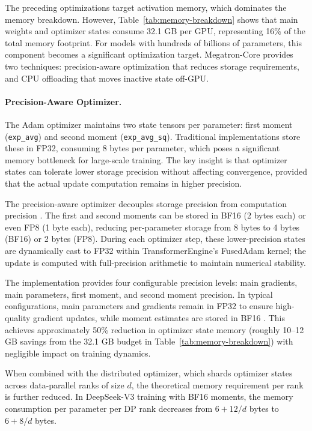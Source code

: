 The preceding optimizations target activation memory, which dominates the memory breakdown. However, Table~\ref{tab:memory-breakdown} shows that main weights and optimizer states consume 32.1 GB per GPU, representing 16\% of the total memory footprint. For models with hundreds of billions of parameters, this component becomes a significant optimization target. Megatron-Core provides two techniques: precision-aware optimization that reduces storage requirements, and CPU offloading that moves inactive state off-GPU.

\paragraph{Precision-Aware Optimizer.}
The Adam optimizer \cite{kingma2014adam} maintains two state tensors per parameter: first moment (\texttt{exp\_avg}) and second moment (\texttt{exp\_avg\_sq}). Traditional implementations store these in FP32, consuming 8 bytes per parameter, which poses a significant memory bottleneck for large-scale training. The key insight is that optimizer states can tolerate lower storage precision without affecting convergence, provided that the actual update computation remains in higher precision.

The precision-aware optimizer decouples storage precision from computation precision \cite{dettmers2022optimizers8bit}. The first and second moments can be stored in BF16 (2 bytes each) or even FP8 (1 byte each), reducing per-parameter storage from 8 bytes to 4 bytes (BF16) or 2 bytes (FP8). During each optimizer step, these lower-precision states are dynamically cast to FP32 within TransformerEngine's FusedAdam kernel; the update is computed with full-precision arithmetic to maintain numerical stability.

The implementation provides four configurable precision levels: main gradients, main parameters, first moment, and second moment precision. In typical configurations, main parameters and gradients remain in FP32 to ensure high-quality gradient updates, while moment estimates are stored in BF16 \cite{liu2024deepseek}. This achieves approximately 50\% reduction in optimizer state memory (roughly 10--12 GB savings from the 32.1 GB budget in Table~\ref{tab:memory-breakdown}) with negligible impact on training dynamics.

When combined with the distributed optimizer, which shards optimizer states across data-parallel ranks of size $d$, the theoretical memory requirement per rank is further reduced. In DeepSeek-V3 training with BF16 moments, the memory consumption per parameter per DP rank decreases from $6+12/d$ bytes to $6+8/d$ bytes.

